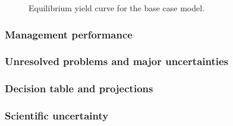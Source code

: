 \documentclass[
]{scrartcl}
\begin{document}


\begin{figure}


\caption{\label{fig-es-yield}Equilibrium yield curve for the base case
model.}

\end{figure}%

\clearpage

\subsubsection{Management performance}\label{management-performance}

\subsubsection{Unresolved problems and major
uncertainties}\label{unresolved-problems-and-major-uncertainties}

\subsubsection{Decision table and
projections}\label{decision-table-and-projections}

\clearpage

\clearpage

\subsubsection{Scientific uncertainty}\label{scientific-uncertainty}
\end{document}
